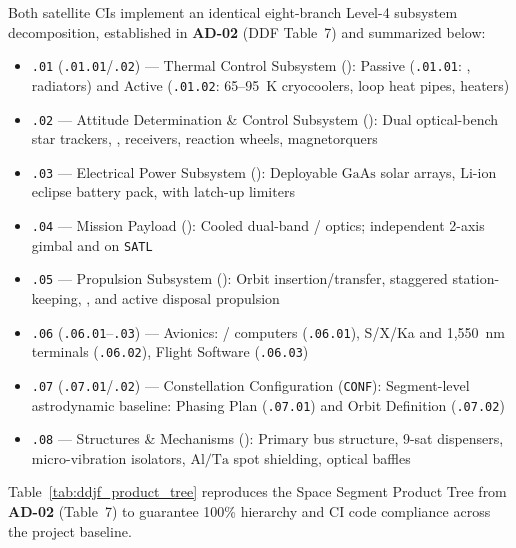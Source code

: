 Both satellite CIs implement an identical eight-branch Level-4 subsystem decomposition, established in \textbf{AD-02} (DDF Table~7) and summarized below:
\begin{itemize}
    \item \texttt{.01} (\texttt{.01.01}/\texttt{.02}) --- Thermal Control Subsystem (): Passive (\texttt{.01.01}: , radiators) and Active (\texttt{.01.02}: 65--95~K cryocoolers, loop heat pipes, heaters)
    \item \texttt{.02} --- Attitude Determination \& Control Subsystem (): Dual optical-bench star trackers,  ,  receivers, reaction wheels, magnetorquers
    \item \texttt{.03} --- Electrical Power Subsystem (): Deployable $\mathrm{GaAs}$ solar arrays, $\mathrm{Li\text{-}ion}$ eclipse battery pack,  with latch-up limiters
    \item \texttt{.04} --- Mission Payload (): Cooled dual-band / optics; independent 2-axis gimbal and  on \texttt{SATL}
    \item \texttt{.05} --- Propulsion Subsystem (): Orbit insertion/transfer, staggered station-keeping, , and active  disposal propulsion
    \item \texttt{.06} (\texttt{.06.01}--\texttt{.03}) --- Avionics: / computers (\texttt{.06.01}), S/X/Ka  and 1,550~nm  terminals (\texttt{.06.02}), Flight Software (\texttt{.06.03})
    \item \texttt{.07} (\texttt{.07.01}/\texttt{.02}) --- Constellation Configuration (\texttt{CONF}): Segment-level astrodynamic baseline: Phasing Plan (\texttt{.07.01}) and Orbit Definition (\texttt{.07.02})
    \item \texttt{.08} --- Structures \& Mechanisms (): Primary bus structure, 9-sat dispensers, micro-vibration isolators, $\mathrm{Al}/\mathrm{Ta}$ spot shielding, optical baffles
\end{itemize}

Table~\ref{tab:ddjf_product_tree} reproduces the Space Segment Product Tree from \textbf{AD-02} (Table~7) to guarantee 100\% hierarchy and CI code compliance across the project baseline.

